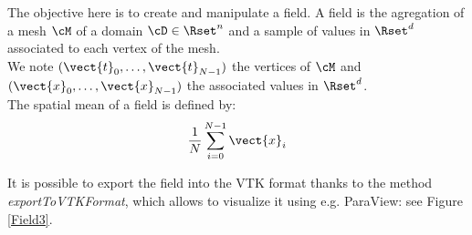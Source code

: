 \renewcommand{\filename}{docUC_StochProc_Field.tex}
\renewcommand{\filetitle}{UC : Manipulation of a field}

\HeaderIILevel

\label{UCField}




The objective here is to create and manipulate a field. A field is the agregation of a mesh $\cM$ of a domain $\cD \in \Rset^n$ and a sample of values in $\Rset^d$ associated to each vertex of the mesh. \\

We note $(\vect{t}_0, \dots, \vect{t}_{N-1})$ the vertices of $\cM$ and $(\vect{x}_0, \dots, \vect{x}_{N-1})$ the associated values in $\Rset^d$.\\

The spatial mean of a field is  defined by:
\begin{align}\label{spatMeanField}
  \displaystyle \frac{1}{N} \sum_{i=0}^{N-1} \vect{x}_i
\end{align}




It is possible to export the field into the VTK format thanks to the method \emph{exportToVTKFormat}, which allows to visualize it using e.g. ParaView: see Figure \ref{Field3}.\\

